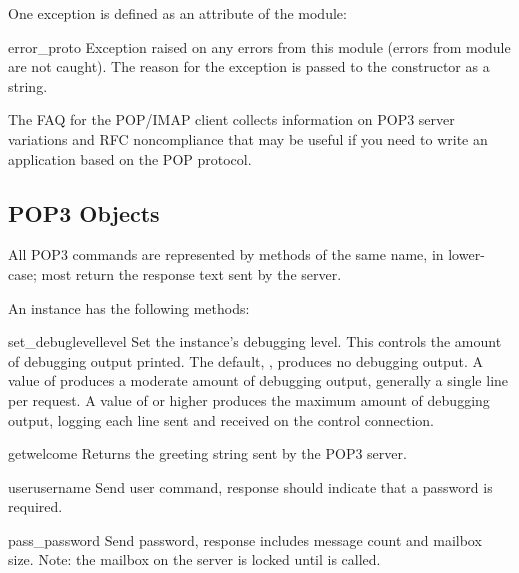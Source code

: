 One exception is defined as an attribute of the  module:

\begin{excdesc}{error_proto}
Exception raised on any errors from this module (errors from
 module are not caught). The reason for the exception
is passed to the constructor as a string.
\end{excdesc}

\begin{seealso}
        {The FAQ for the  POP/IMAP client collects
         information on POP3 server variations and RFC noncompliance
         that may be useful if you need to write an application based
         on the POP protocol.}
\end{seealso}


\subsection{POP3 Objects \label{pop3-objects}}

All POP3 commands are represented by methods of the same name,
in lower-case; most return the response text sent by the server.

An  instance has the following methods:


\begin{methoddesc}[POP3]{set_debuglevel}{level}
Set the instance's debugging level.  This controls the amount of
debugging output printed.  The default, , produces no
debugging output.  A value of  produces a moderate amount of
debugging output, generally a single line per request.  A value of
 or higher produces the maximum amount of debugging output,
logging each line sent and received on the control connection.
\end{methoddesc}

\begin{methoddesc}[POP3]{getwelcome}{}
Returns the greeting string sent by the POP3 server.
\end{methoddesc}

\begin{methoddesc}[POP3]{user}{username}
Send user command, response should indicate that a password is required.
\end{methoddesc}

\begin{methoddesc}[POP3]{pass_}{password}
Send password, response includes message count and mailbox size.
Note: the mailbox on the server is locked until  is
called.
\end{methoddesc}

